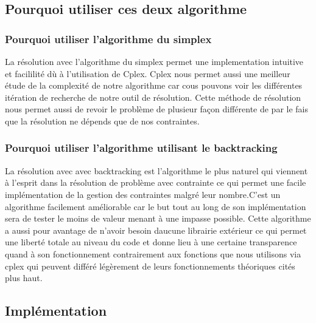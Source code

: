 \subsection{Pourquoi utiliser ces deux algorithme}

\subsubsection{Pourquoi utiliser l'algorithme du simplex}

La résolution avec l'algorithme du simplex permet une implementation intuitive et facililité dù à l'utilisation de Cplex. Cplex nous permet aussi une meilleur étude de la complexité de notre algorithme car cous pouvons voir les différentes itération de recherche de notre outil de résolution. Cette méthode de résolution nous permet aussi de revoir le problème de plusieur façon différente de par le fais que la résolution ne dépends que de nos contraintes.

\subsubsection{Pourquoi utiliser l'algorithme utilisant le backtracking}

La résolution avec avec backtracking est l'algorithme le plus naturel qui viennent à l'esprit dans la résolution de problème avec contrainte ce qui permet une facile implémentation de la gestion des contraintes malgré leur nombre.C'est un algorithme facilement améliorable car le but tout au long de son implémentation sera de tester le moins de valeur menant à une impasse possible. Cette algorithme a aussi pour avantage de n'avoir besoin daucune librairie extérieur ce qui permet une liberté totale au niveau du code et donne lieu à une certaine transparence quand à son fonctionnement contrairement aux fonctions que nous utilisons via cplex qui peuvent différé légèrement de leurs fonctionnements théoriques cités plus haut.

\subsection{Implémentation}
